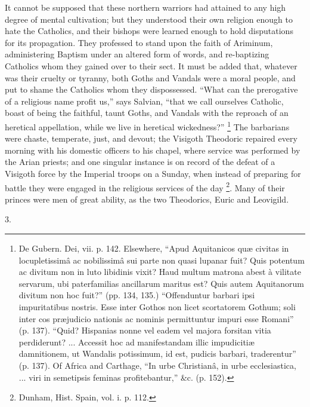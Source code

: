 It cannot be supposed that these northern warriors had attained to
any high degree of mental cultivation; but they understood their own
religion enough to hate the Catholics, and their bishops were learned
enough to hold disputations for its propagation. They professed to
stand upon the faith of Ariminum, administering Baptism under an
altered form of words, and re-baptizing Catholics whom they gained over
to their sect. It must be added that, whatever was their cruelty or
tyranny, both Goths and Vandals were a moral people, and put to shame
the Catholics whom they dispossessed. ``What can the prerogative
of a religious name profit us,'' says Salvian, ``that we call
ourselves Catholic, boast of being the faithful, taunt Goths, and
Vandals with the reproach of an heretical appellation, while we live
in heretical wickedness?'' \footnote{De Gubern. Dei, vii. p. 142. Elsewhere, ``Apud Aquitanicos
quæ civitas in locupletissimâ ac nobilissimâ sui parte non quasi
lupanar fuit? Quis potentum ac divitum non in luto libidinis vixit?
Haud multum matrona abest à vilitate servarum, ubi paterfamilias
ancillarum maritus est? Quis autem Aquitanorum divitum non hoc fuit?''
(pp. 134, 135.) ``Offenduntur barbari ipsi impuritatibus nostris.
Esse inter Gothos non licet scortatorem Gothum; soli inter cos
præjudicio nationis ac nominis permittuntur impuri esse Romani''
(p. 137). ``Quid? Hispanias nonne vel eadem vel majora forsitan
vitia perdiderunt? ... Accessit hoc ad manifestandam illic
impudicitiæ damnitionem, ut Wandalis potissimum, id est, pudicis
barbari, traderentur'' (p. 137). Of Africa and Carthage, ``In
urbe Christianâ, in urbe ecclesiastica, ... viri in semetipsis feminas
profitebantur,'' \&c. (p. 152).} The barbarians were chaste, temperate, just, and devout; the Visigoth
Theodoric repaired every morning with his domestic officers to his
chapel, where service was performed by the Arian priests; and one
singular instance is on record of the defeat of a Visigoth force by
the Imperial troops on a Sunday, when instead of preparing for battle
they were engaged in the religious services of the day \footnote{Dunham, Hist. Spain, vol. i. p. 112.}. Many of their princes were men of great ability, as the two
Theodorics, Euric and Leovigild.

3.

